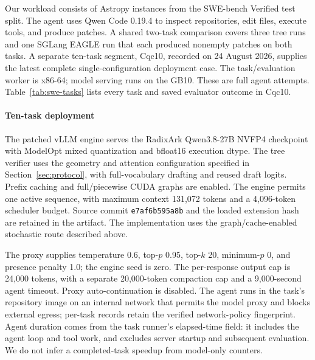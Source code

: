 Our workload consists of Astropy instances from the SWE-bench Verified test split. The agent uses Qwen Code 0.19.4 to inspect repositories, edit files, execute tools, and produce patches. A shared two-task comparison covers three tree runs and one SGLang EAGLE run that each produced nonempty patches on both tasks. A separate ten-task segment, Cqc10, recorded on 24 August 2026, supplies the latest complete single-configuration deployment case. The task/evaluation worker is x86-64; model serving runs on the GB10. These are full agent attempts. Table~\ref{tab:swe-tasks} lists every task and saved evaluator outcome in Cqc10.

\paragraph{Ten-task deployment}
The patched vLLM engine serves the RadixArk Qwen3.8-27B NVFP4 checkpoint with ModelOpt mixed quantization and bfloat16 execution dtype. The tree verifier uses the geometry and attention configuration specified in Section~\ref{sec:protocol}, with full-vocabulary drafting and reused draft logits. Prefix caching and full/piecewise CUDA graphs are enabled. The engine permits one active sequence, with maximum context 131,072 tokens and a 4,096-token scheduler budget. Source commit \texttt{e7af6b595a8b} and the loaded extension hash are retained in the artifact. The implementation uses the graph/cache-enabled stochastic route described above.

The proxy supplies temperature 0.6, top-$p$ 0.95, top-$k$ 20, minimum-$p$ 0, and presence penalty 1.0; the engine seed is zero. The per-response output cap is 24,000 tokens, with a separate 20,000-token compaction cap and a 9,000-second agent timeout. Proxy auto-continuation is disabled. The agent runs in the task's repository image on an internal network that permits the model proxy and blocks external egress; per-task records retain the verified network-policy fingerprint. Agent duration comes from the task runner's elapsed-time field: it includes the agent loop and tool work, and excludes server startup and subsequent evaluation. We do not infer a completed-task speedup from model-only counters.

